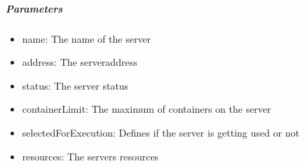 \subparagraph{Parameters}

\begin{itemize}
	\item{name:}
	The name of the server
	\item{address:}
	The serveraddress
	\item{status:}
	The server status
	\item{containerLimit:}
	The maximum of containers on the server
	\item{selectedForExecution:}
	Defines if the server is getting used or not
	\item{resources:}
	The servers resources
\end{itemize}

